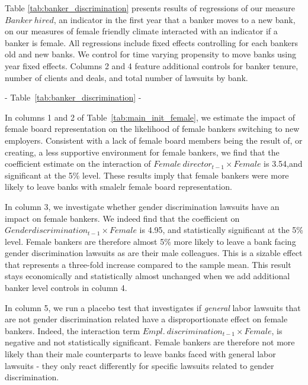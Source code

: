 
Table \ref{tab:banker_discrimination} presents results of regressions of our measure $Banker~hired$, an indicator in the first year that a banker moves to a new bank, on our measures of female friendly climate interacted with an indicator if a banker is female. All regressions include fixed effects controlling for each bankers old and new banks. We control for time varying propensity to move banks using year fixed effects. Columns 2 and 4 feature additional controls for banker tenure, number of clients and deals, and total number of lawsuits by bank. 
 
\begin{center} - Table~\ref{tab:banker_discrimination} - \end{center}

In columns 1 and 2 of  Table~\ref{tab:main_init_female}, we estimate the impact of female board representation on the likelihood of female bankers switching to new employers. Consistent with a lack of female board members being the result of, or creating, a less supportive environment for female bankers, we find that the coefficient estimate on the interaction of  $Female~director_{t-1} \times Female$ is 3.54,and significant at the 5\% level. These results imply that female bankers were more likely to leave banks with smalelr female board representation. 

In column 3, we investigate whether gender discrimination lawsuits have an impact on female bankers. We indeed find that the coefficient on $Gender discrimination_{t-1} \times Female$ is 4.95, and statistically significant at the 5\% level. Female bankers are therefore almost 5\% more likely to leave a bank facing gender discrimination lawsuits as are their male colleagues. This is a sizable effect that represents a three-fold increase compared to the sample mean. This result stays economically and statistically almost unchanged when we add additional banker level controls in column 4.

In column 5, we run a placebo test that investigates if \emph{general} labor lawsuits that are not gender discrimination related have a disproportionate effect on female bankers. Indeed, the interaction term  $Empl.~discrimination_{t-1} \times Female$, is negative and  not statistically significant. Female bankers are therefore not more likely than their male counterparts to leave banks faced with general labor lawsuits - they only react differently for specific lawsuits related to gender discrimination. 

